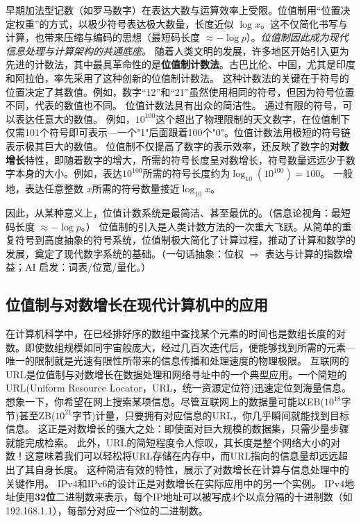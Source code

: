 
早期加法型记数（如罗马数字）在表达大数与运算效率上受限。位值制用“位置决定权重”的方式，以极少符号表达极大数量，长度近似 $\log x$。这不仅简化书写与计算，也带来压缩与编码的思想（最短码长度 $\approx-\log p$）。\emph{位值制因此成为现代信息处理与计算架构的共通底座。}
随着人类文明的发展，许多地区开始引入更为先进的计数法，其中最具革命性的是{\bf 位值制计数法}。古巴比伦、中国，尤其是印度和阿拉伯，率先采用了这种创新的位值制计数法。
这种计数法的关键在于符号的位置决定了其数值。例如，数字“12”和“21”虽然使用相同的符号，但因为符号位置不同，代表的数值也不同。
位值计数法具有出众的简洁性。
通过有限的符号，可以表达任意大的数值。
例如，$10^{100}$这个超出了物理限制的天文数字，在位值制下仅需101个符号即可表示---一个"1"后面跟着100个"0"。位值计数法用极短的符号链表示极其巨大的数值。
位值制不仅提高了数字的表示效率，还反映了数字的{\bf 对数增长}特性，即随着数字的增大，所需的符号长度呈对数增长，符号数量远远少于数字本身的大小。例如，表达$10^{100}$所需的符号长度约为$\log_{10}(10^{100})=100$。
一般地，表达任意整数 $x$所需的符号数量接近${\log_{10} x}$。

因此，从某种意义上，位值计数系统是最简洁、甚至最优的。{（信息论视角：最短码长度 $\approx -\log p$。）}
位值制的引入是人类计数方法的一次重大飞跃。从简单的重复符号到高度抽象的符号系统，位值制极大简化了计算过程，推动了计算和数学的发展，奠定了现代数字系统的基础。{（一句话抽象：位权 $\Rightarrow$ 表达与计算的指数增益；AI 启发：词表/位宽/量化。）}
\subsection{位值制与对数增长在现代计算机中的应用}


在计算机科学中，在已经排好序的数组中查找某个元素的时间也是数组长度的对数。即使数组规模如同宇宙般庞大，经过几百次迭代后，便能够找到所需的元素---唯一的限制就是光速有限性所带来的信息传播和处理速度的物理极限。
互联网的URL是位值制与对数增长在数据处理和网络寻址中的一个典型应用。一个简短的URL(Uniform Resource Locator，URL，统一资源定位符)迅速定位到海量信息。
想象一下，你希望在网上搜索某项信息。尽管互联网上的数据量可能以EB($10^{18}$字节)甚至ZB($10^{21}$字节)计量，只要拥有对应信息的URL，你几乎瞬间就能找到目标信息。
这正是对数增长的强大之处：即使面对巨大规模的数据集，只需少量步骤就能完成检索。
此外，URL的简短程度令人惊叹，其长度是整个网络大小的对数！这意味着我们可以轻松将URL存储在内存中，而URL指向的信息量却远远超出了其自身长度。
这种简洁有效的特性，展示了对数增长在计算与信息处理中的关键作用。
IPv4和IPv6的设计正是对数增长在实际应用中的另一个实例。
 IPv4地址使用{\bf 32位}二进制数来表示，每个IP地址可以被写成4个以点分隔的十进制数（如192.168.1.1），每部分对应一个8位的二进制数。

